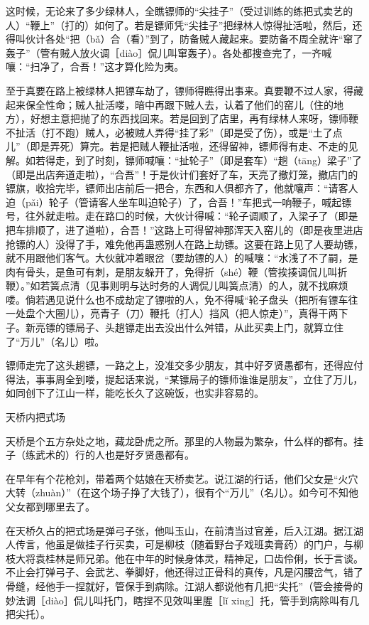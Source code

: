 \documentclass[12pt,UTF8]{ctexbook}
\begin{document}
这时候，无论来了多少绿林人，全瞧镖师的“尖挂子”（受过训练的练把式卖艺的人）“鞭上”（打的）如何了。若是镖师凭“尖挂子”把绿林人惊得扯活啦，然后，还得叫伙计各处“把（bǎ）合（看）”到了，防备贼人藏起来。要防备不周全就许“窜了轰子”（管有贼人放火调［diào］侃儿叫窜轰子）。各处都搜查完了，一齐喊嚷：“扫净了，合吾！”这才算化险为夷。

至于真要在路上被绿林人把镖车劫了，镖师得瞧得出事来。真要鞭不过人家，得藏起来保全性命；贼人扯活喽，暗中再跟下贼人去，认着了他们的窑儿（住的地方），好想主意把抛了的东西找回来。若是回到了店里，再有绿林人来呀，镖师鞭不扯活（打不跑）贼人，必被贼人弄得“挂了彩”（即是受了伤），或是“土了点儿”（即是弄死）算完。若是把贼人鞭扯活啦，还得留神，镖师得有走、不走的见解。如若得走，到了时刻，镖师喊嚷：“扯轮子”（即是套车）“趟（tāng）梁子”了（即是出店奔道走啦），“合吾”！于是伙计们套好了车，天亮了撤灯笼，撤店门的镖旗，收拾完毕，镖师出店前后一把合，东西和人俱都齐了，他就嚷声：“请客人迫（pǎi）轮子（管请客人坐车叫迫轮子）了，合吾！”车把式一响鞭子，喊起镖号，往外就走啦。走在路口的时候，大伙计得喊：“轮子调顺了，入梁子了（即是把车排顺了，进了道啦），合吾！”这路上可得留神那浑天入窑儿的（即是夜里进店抢镖的人）没得了手，难免他再蛊惑别人在路上劫镖。这要在路上见了人要劫镖，就不用跟他们客气。大伙就冲着眼岔（要劫镖的人）的喊嚷：“水浅了不了嗣，是肉有骨头，是鱼可有刺，是朋友躲开了，免得折（shé）鞭（管挨揍调侃儿叫折鞭）。”如若簧点清（见事则明与达时务的人调侃儿叫簧点清）的人，就不找麻烦喽。倘若遇见说什么也不成劫定了镖啦的人，免不得喊“轮子盘头（把所有镖车往一处盘个大圈儿），亮青子（刀）鞭托（打人）挡风（把人惊走）”，真得干两下子。新亮镖的镖局子、头趟镖走出去没出什么舛错，从此买卖上门，就算立住了“万儿”（名儿）啦。

镖师走完了这头趟镖，一路之上，没准交多少朋友，其中好歹贤愚都有，还得应付得法，事事周全到喽，提起话来说，“某镖局子的镖师谁谁是朋友”，立住了万儿，如同创下了江山一样，能吃长久了这碗饭，也实非容易的。





天桥内把式场


天桥是个五方杂处之地，藏龙卧虎之所。那里的人物最为繁杂，什么样的都有。挂子（练武术的）行的人也是好歹贤愚都有。

在早年有个花枪刘，带着两个姑娘在天桥卖艺。说江湖的行话，他们父女是“火穴大转（zhuàn）”（在这个场子挣了大钱了），很有个“万儿”（名儿）。如今可不知他父女都到哪里去了。

在天桥久占的把式场是弹弓子张，他叫玉山，在前清当过官差，后入江湖。据江湖人传言，他虽是做挂子行买卖，可是柳枝（随着野台子戏班卖膏药）的门户，与柳枝大将袁桂林是师兄弟。他在中年的时候身体灵，精神足，口齿伶俐，长于言谈。不止会打弹弓子、会武艺、拳脚好，他还得过正骨科的真传，凡是闪腰岔气，错了骨缝，经他手一捏就好，管保手到病除。江湖人都说他有几把“尖托”（管会接骨的妙法调［diào］侃儿叫托门，瞎捏不见效叫里腥［lǐ xing］托，管手到病除叫有几把尖托）。
\end{document}
